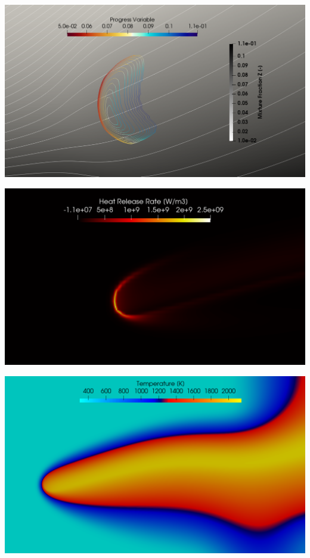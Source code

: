 \documentclass[a0paper,portrait]{baposter}
\begin{document}
\begin{poster}
{		    \begin{minipage}{1\linewidth}
		     \includegraphics[width=\linewidth]{cont_new.png}
		    \end{minipage}
		    \begin{minipage}{1\linewidth}
		    \includegraphics[width=\linewidth]{hrr.png}
		    \end{minipage}
		    \begin{minipage}{1\linewidth}
		      \includegraphics[width=\linewidth]{temp.png}

\end{minipage}}
\end{poster}
\end{document}
